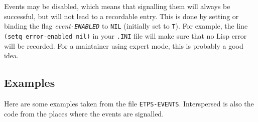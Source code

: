 Events may be disabled, which means that signalling them will always
be successful, but will not lead to a recordable entry.  This is done
by setting or binding the flag {\it event{\tt -ENABLED}} to {\tt NIL} (initially
set to {\tt T}).  For example, the line {\tt (setq error-enabled nil)}
in your {\tt .INI} file will make sure that no Lisp error will be recorded.
For a maintainer using expert mode, this is probably a good idea.

\subsection{Examples}

Here are some examples taken from the file {\tt ETPS-EVENTS}.  Interspersed
is also the code from the places where the events are signalled.

